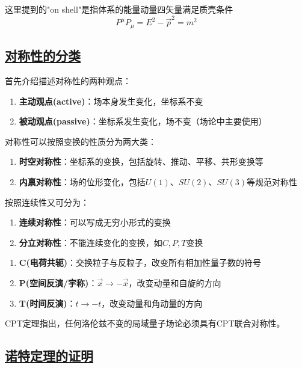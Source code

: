 这里提到的"on shell"是指体系的能量动量四矢量满足质壳条件
\begin{equation*}
    P^\mu P_\mu = E^2 - \vec{p}^2 = m^2
\end{equation*}

\subsection{\protect\hyperlink{:}{对称性的分类}}

首先介绍描述对称性的两种观点：
\begin{enumerate}
    \item \textbf{主动观点(active)}：场本身发生变化，坐标系不变
    \item \textbf{被动观点(passive)}：坐标系发生变化，场不变（场论中主要使用）
\end{enumerate}

对称性可以按照变换的性质分为两大类：
\begin{enumerate}
    \item \textbf{时空对称性}：坐标系的变换，包括旋转、推动、平移、共形变换等
    \item \textbf{内禀对称性}：场的位形变化，包括$U(1)$、$SU(2)$、$SU(3)$等规范对称性
\end{enumerate}

按照连续性又可分为：
\begin{enumerate}
    \item \textbf{连续对称性}：可以写成无穷小形式的变换
    \item \textbf{分立对称性}：不能连续变化的变换，如$C,P,T$变换
\end{enumerate}

\begin{example}[分立对称性$C,P,T$]
    \begin{enumerate}
        \item \textbf{C(电荷共轭)}：交换粒子与反粒子，改变所有相加性量子数的符号
        \item \textbf{P(空间反演/宇称)}：$\vec{x} \to -\vec{x}$，改变动量和自旋的方向
        \item \textbf{T(时间反演)}：$t \to -t$，改变动量和角动量的方向
    \end{enumerate}
    
    CPT定理指出，任何洛伦兹不变的局域量子场论必须具有CPT联合对称性。
\end{example}

\subsection{\protect\hyperlink{:}{诺特定理的证明}}

